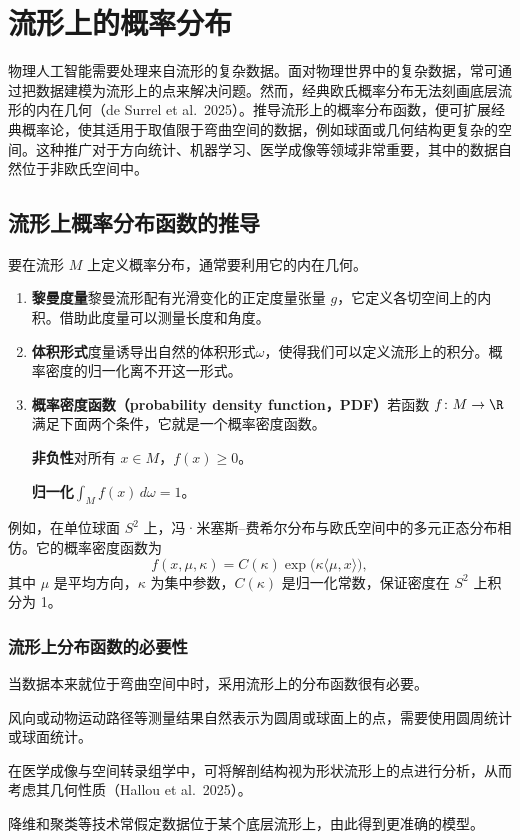 \section{流形上的概率分布}

物理人工智能需要处理来自流形的复杂数据。面对物理世界中的复杂数据，常可通过把数据建模为流形上的点来解决问题。然而，经典欧氏概率分布无法刻画底层流形的内在几何（de Surrel et al.\ 2025）。推导流形上的概率分布函数，便可扩展经典概率论，使其适用于取值限于弯曲空间的数据，例如球面或几何结构更复杂的空间。这种推广对于方向统计、机器学习、医学成像等领域非常重要，其中的数据自然位于非欧氏空间中。

\subsection{流形上概率分布函数的推导}

要在流形 $M$ 上定义概率分布，通常要利用它的内在几何。
\begin{enumerate}
  \item \textbf{黎曼度量}黎曼流形配有光滑变化的正定度量张量 $g$，它定义各切空间上的内积。借助此度量可以测量长度和角度。
  \item \textbf{体积形式}度量诱导出自然的体积形式$\omega$，使得我们可以定义流形上的积分。概率密度的归一化离不开这一形式。
  \item \textbf{概率密度函数（probability density function，PDF）}若函数 $f\colon M\to\R$ 满足下面两个条件，它就是一个概率密度函数。

  \textbf{非负性}对所有 $x\in M$，$f(x)\geq 0$。

  \textbf{归一化}$\displaystyle\int_M f(x)\,d\omega=1$。
\end{enumerate}

例如，在单位球面 $S^2$ 上，冯·米塞斯–费希尔分布与欧氏空间中的多元正态分布相仿。它的概率密度函数为
\[
  f(x,\mu,\kappa)=C(\kappa)\exp\bigl(\kappa\langle\mu,x\rangle\bigr),
\]
其中 $\mu$ 是平均方向，$\kappa$ 为集中参数，$C(\kappa)$ 是归一化常数，保证密度在 $S^2$ 上积分为 1。

\subsubsection{流形上分布函数的必要性}

当数据本来就位于弯曲空间中时，采用流形上的分布函数很有必要。
\begin{description}[leftmargin=2em]
  \item[方向数据] 风向或动物运动路径等测量结果自然表示为圆周或球面上的点，需要使用圆周统计或球面统计。
  \item[形状分析] 在医学成像与空间转录组学中，可将解剖结构视为形状流形上的点进行分析，从而考虑其几何性质（Hallou et al.\ 2025）。
  \item[机器学习] 降维和聚类等技术常假定数据位于某个底层流形上，由此得到更准确的模型。
\end{description}

